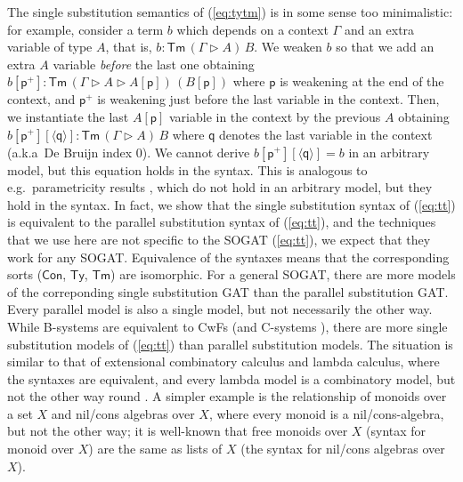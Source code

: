 \documentclass[sigplan,10pt,anonymous,review]{acmart}\settopmatter{printfolios=true,printccs=false,printacmref=false}
\newcommand{\Ty}{\mathsf{Ty}}
\newcommand{\Tm}{\mathsf{Tm}}
\newcommand{\Con}{\mathsf{Con}}
\newcommand{\p}{\mathsf{p}}
\newcommand{\q}{\mathsf{q}}
\newcommand{\ext}{\mathop{\triangleright}}
\begin{document}
The single substitution semantics of (\ref{eq:tytm}) is in some sense
too minimalistic: for example, consider a term $b$ which depends on a
context $\Gamma$ and an extra variable of type $A$, that is, $b :
\Tm\,(\Gamma\ext A)\,B$. We weaken $b$ so that we add an extra $A$
variable \emph{before} the last one obtaining $ b[\p^+] :
\Tm\,(\Gamma\ext A\ext A[\p])\,(B[\p]) $ where $\p$ is weakening at
the end of the context, and $\p^+$ is weakening just before the last
variable in the context. Then, we instantiate the last $A[\p]$
variable in the context by the previous $A$ obtaining
$b[\p^+][\langle\q\rangle] : \Tm\,(\Gamma\ext A)\,B$ where $\q$
denotes the last variable in the context (a.k.a\ De Bruijn index $0$).
We cannot derive $b[\p^+][\langle\q\rangle] = b$ in an arbitrary
model, but this equation holds in the syntax.
This is analogous to e.g.\ parametricity results
\cite{DBLP:journals/jfp/BernardyJP12}, which do not hold in an
arbitrary model, but they hold in the syntax. In fact, we show that
the single substitution syntax of (\ref{eq:tt}) is equivalent to the
parallel substitution syntax of (\ref{eq:tt}), and the techniques that
we use here are not specific to the SOGAT (\ref{eq:tt}), we expect
that they work for any SOGAT. Equivalence of the syntaxes means that
the corresponding sorts ($\Con$, $\Ty$, $\Tm$) are isomorphic. For a
general SOGAT, there are more models of the correponding single
substitution GAT than the parallel substitution GAT. Every parallel
model is also a single model, but not necessarily the other way. While
B-systems are equivalent to CwFs (and C-systems
\cite{AHRENS_EMMENEGGER_NORTH_RIJKE_2023}), there are more single
substitution models of (\ref{eq:tt}) than parallel substitution
models. The situation is similar to that of extensional combinatory
calculus and lambda calculus, where the syntaxes are equivalent, and
every lambda model is a combinatory model, but not the other way round
\cite{DBLP:conf/fscd/AltenkirchKSV23}. A simpler example is the
relationship of monoids over a set $X$ and nil/cons algebras over $X$,
where every monoid is a nil/cons-algebra, but not the other way; it is
well-known that free monoids over $X$ (syntax for monoid over $X$) are
the same as lists of $X$ (the syntax for nil/cons algebras over $X$).
\end{document}
